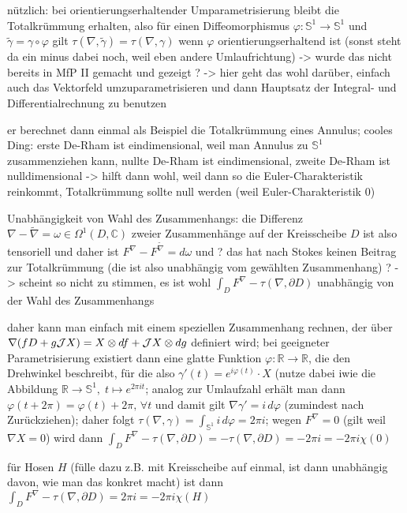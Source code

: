 \documentclass[../H_Analysis_main.tex]{subfiles}
\begin{document}
nützlich: bei orientierungserhaltender Umparametrisierung bleibt die Totalkrümmung erhalten, also für einen Diffeomorphismus $\varphi: \mathbb{S}^1 \rightarrow \mathbb{S}^1$ und $\tilde{\gamma} = \gamma \circ \varphi$ gilt $\tau(\nabla, \tilde{\gamma}) = \tau(\nabla, \gamma)$ wenn $\varphi$ orientierungserhaltend ist (sonst steht da ein minus dabei noch, weil eben andere Umlaufrichtung) -> wurde das nicht bereits in MfP II gemacht und gezeigt ? -> hier geht das wohl darüber, einfach auch das Vektorfeld umzuparametrisieren und dann Hauptsatz der Integral- und Differentialrechnung zu benutzen


er berechnet dann einmal als Beispiel die Totalkrümmung eines Annulus; cooles Ding: erste De-Rham ist eindimensional, weil man Annulus zu $\mathbb{S}^1$ zusammenziehen kann, nullte De-Rham ist eindimensional, zweite De-Rham ist nulldimensional -> hilft dann wohl, weil dann so die Euler-Charakteristik reinkommt, Totalkrümmung sollte null werden (weil Euler-Charakteristik 0)

Unabhängigkeit von Wahl des Zusammenhangs: die Differenz $\nabla - \tilde{\nabla} = \omega \in \Omega^1(D, \mathbb{C})$ zweier Zusammenhänge auf der Kreisscheibe $D$ ist also tensoriell und daher ist $F^\nabla - F^{\tilde{\nabla}} = d\omega$ und ? das hat nach Stokes keinen Beitrag zur Totalkrümmung (die ist also unabhängig vom gewählten Zusammenhang) ? -> scheint so nicht zu stimmen, es ist wohl $\int_D F^\nabla - \tau(\nabla, \partial D)$ unabhängig von der Wahl des Zusammenhangs

daher kann man einfach mit einem speziellen Zusammenhang rechnen, der über $\nabla\qty(f D + g \mathcal{J} X) = X \otimes df + \mathcal{J}X \otimes dg$ definiert wird; bei geeigneter Parametrisierung existiert dann eine glatte Funktion $\varphi: \mathbb{R} \rightarrow \mathbb{R}$, die den Drehwinkel beschreibt, für die also $\gamma'(t) = e^{i \varphi(t)} \cdot X$ (nutze dabei iwie die Abbildung $\mathbb{R} \rightarrow \mathbb{S}^1, \; t \mapsto e^{2 \pi i t}$; analog zur Umlaufzahl erhält man dann $\varphi(t + 2\pi) = \varphi(t) + 2\pi, \, \forall t$ und damit gilt $\nabla \gamma' = i \, d\varphi$ (zumindest nach Zurückziehen); daher folgt $\tau(\nabla, \gamma) = \int_{\mathbb{S}^1} i \, d\varphi = 2\pi i$; wegen $F^\nabla = 0$ (gilt weil $\nabla X = 0$) wird dann $\int_D F^\nabla - \tau(\nabla, \partial D) = - \tau(\nabla, \partial D) = -2\pi i = -2\pi i \chi(0)$

für Hosen $H$ (fülle dazu z.B. mit Kreisscheibe auf einmal, ist dann unabhängig davon, wie man das konkret macht) ist dann $\int_D F^\nabla - \tau(\nabla, \partial D) = 2\pi i = -2\pi i \chi(H)$
\end{document}
